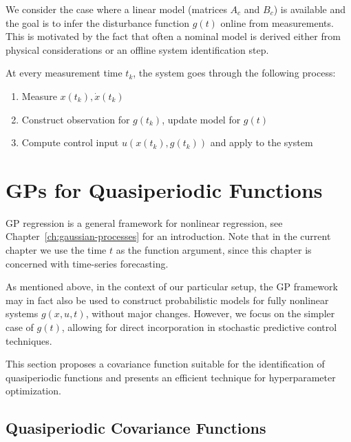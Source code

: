 We consider the case where a linear model (matrices $A_c$ and $B_c$) is
available and the goal is to infer the disturbance function $g(t)$ online from
measurements. This is motivated by the fact that often a nominal model is
derived either from physical considerations or an offline system identification
step.

At every measurement time $t_k$, the system goes
through the following process:
\begin{enumerate}
  \item Measure $x(t_k), \dot x(t_k)$
  \item Construct observation for $g(t_k)$, update model for $g(t)$
  \item Compute control input $u(x(t_k),g(t_k))$ and apply to the system
\end{enumerate}

\section{GPs for Quasiperiodic Functions}
\label{sec:gps_for_quasiperiodic_functions}

GP regression is a general framework for nonlinear regression, see
Chapter~\ref{ch:gaussian-processes} for an introduction. Note that in the
current chapter we use the time $t$ as the function argument, since this
chapter is concerned with time-series forecasting.

As mentioned above, in the context of our particular setup, the GP framework
may in fact also be used to construct probabilistic models for fully nonlinear
systems $g(x,u,t)$, without major changes. However, we focus on
the simpler case of $g(t)$, allowing for direct incorporation in stochastic
predictive control techniques.

This section proposes a covariance function suitable for the identification
of quasiperiodic functions and presents an efficient technique for
hyperparameter optimization.

\subsection{Quasiperiodic Covariance Functions}
\label{sec:quasiperiodic_covariance_function}

